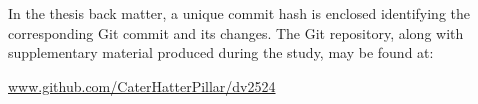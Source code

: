 In the thesis back matter, a unique commit hash is enclosed identifying the corresponding Git commit and its changes.
The Git repository, along with supplementary material produced during the study, may be found at:
\begin{center}
\href{https://github.com/CaterHatterPillar/dv2524}{www.github.com/CaterHatterPillar/dv2524}
\end{center}
